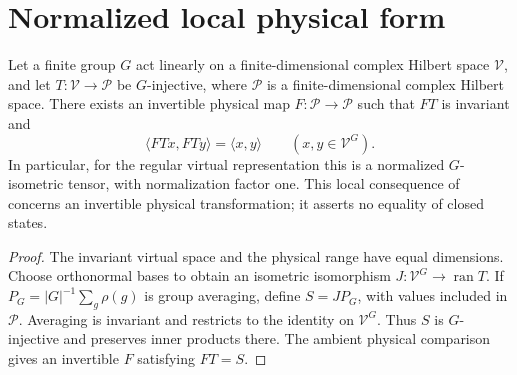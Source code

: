 \section{Normalized local physical form}%
\label{sec:peps_g_injective_physical_normal_form}

\begin{lemma}%
    \label{thm:peps_g_injective_normalized_physical_form}
    \leanok
    Let a finite group $G$ act linearly on a finite-dimensional
    complex Hilbert space $\mathcal V$, and let
    $T:\mathcal V\to\mathcal P$ be $G$-injective, where
    $\mathcal P$ is a finite-dimensional complex Hilbert space.
    There exists an invertible physical map
    $F:\mathcal P\to\mathcal P$ such that $FT$ is invariant and
    \[
        \langle FTx,FTy\rangle=\langle x,y\rangle
        \qquad(x,y\in\mathcal V^G).
    \]
    In particular, for the regular virtual representation this is
    a normalized $G$-isometric tensor, with normalization factor one.
    This local consequence of \cite[Definition~5.1 and the definition
        of $G$-isometric PEPS]{Schuch2010PEPS} concerns an invertible
    physical transformation; it asserts no equality of closed states.
\end{lemma}

\begin{proof}\leanok
    The invariant virtual space and the physical range have equal
    dimensions. Choose orthonormal bases to obtain an isometric
    isomorphism $J:\mathcal V^G\to\operatorname{ran}T$.
    If $P_G=|G|^{-1}\sum_g\rho(g)$ is group averaging, define
    $S=JP_G$, with values included in $\mathcal P$.
    Averaging is invariant and restricts to the identity on
    $\mathcal V^G$. Thus $S$ is $G$-injective and preserves
    inner products there. The ambient physical comparison gives
    an invertible $F$ satisfying $FT=S$.
\end{proof}
